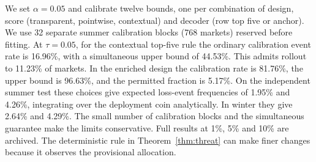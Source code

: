 We set $\alpha=0.05$ and calibrate twelve bounds, one per combination of design, score (transparent, pointwise, contextual) and decoder (row top five or anchor). We use 32 separate summer calibration blocks (768 markets) reserved before fitting. At $\tau=0.05$, for the contextual top-five rule the ordinary calibration event rate is 16.96\%, with a simultaneous upper bound of 44.53\%. This admits rollout to 11.23\% of markets. In the enriched design the calibration rate is 81.76\%, the upper bound is 96.63\%, and the permitted fraction is 5.17\%. On the independent summer test these choices give expected loss-event frequencies of 1.95\% and 4.26\%, integrating over the deployment coin analytically. In winter they give 2.64\% and 4.29\%. The small number of calibration blocks and the simultaneous guarantee make the limits conservative. Full results at 1\%, 5\% and 10\% are archived. The deterministic rule in Theorem~\ref{thm:threat} can make finer changes because it observes the provisional allocation.
